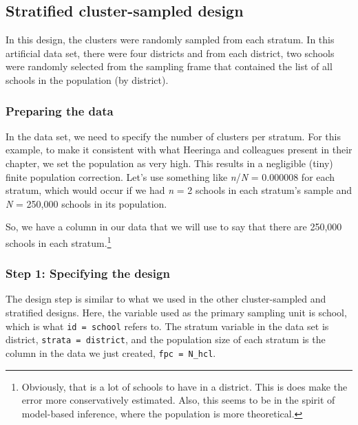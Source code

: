 \documentclass[
]{article}
\newenvironment{Shaded}{\begin{snugshade}}{\end{snugshade}}
\newcommand{\DecValTok}[1]{\textcolor[rgb]{0.00,0.00,0.81}{#1}}
\newcommand{\NormalTok}[1]{#1}
\newcommand{\OperatorTok}[1]{\textcolor[rgb]{0.81,0.36,0.00}{\textbf{#1}}}
\newcommand{\StringTok}[1]{\textcolor[rgb]{0.31,0.60,0.02}{#1}}
\begin{document}
\hypertarget{stratified-cluster-sampled-design}{%
\subsection{Stratified cluster-sampled design}\label{stratified-cluster-sampled-design}}

In this design, the clusters were randomly sampled from each stratum. In this artificial data set, there were four districts and from each district, two schools were randomly selected from the sampling frame that contained the list of all schools in the population (by district).

\hypertarget{preparing-the-data-1}{%
\subsubsection{Preparing the data}\label{preparing-the-data-1}}

In the data set, we need to specify the number of clusters per stratum. For this example, to make it consistent with what Heeringa and colleagues present in their chapter, we set the population as very high. This results in a negligible (tiny) finite population correction. Let's use something like \emph{n}/\emph{N} = 0.000008 for each stratum, which would occur if we had \emph{n} = 2 schools in each stratum's sample and \emph{N} = 250,000 schools in its population.

\begin{Shaded}
\end{Shaded}

So, we have a column in our data that we will use to say that there are 250,000 schools in each stratum.\footnote{Obviously, that is a lot of schools to have in a district. This is does make the error more conservatively estimated. Also, this seems to be in the spirit of model-based inference, where the population is more theoretical.}

\hypertarget{step-1-specifying-the-design-2}{%
\subsubsection{Step 1: Specifying the design}\label{step-1-specifying-the-design-2}}

The design step is similar to what we used in the other cluster-sampled and stratified designs. Here, the variable used as the primary sampling unit is school, which is what \texttt{id\ =\ school} refers to. The stratum variable in the data set is district, \texttt{strata\ =\ district}, and the population size of each stratum is the column in the data we just created, \texttt{fpc\ =\ N\_hcl}.
\end{document}
